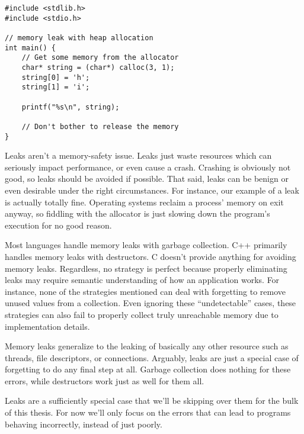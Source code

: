 \begin{verbatim}
#include <stdlib.h>
#include <stdio.h>

// memory leak with heap allocation
int main() {
    // Get some memory from the allocator
    char* string = (char*) calloc(3, 1);
    string[0] = 'h';
    string[1] = 'i';

    printf("%s\n", string);

    // Don't bother to release the memory
}
\end{verbatim}

Leaks aren't a memory-safety issue. Leaks just waste resources which can
seriously impact performance, or even cause a crash. Crashing is obviously not
good, so leaks should be avoided if possible. That said, leaks can be benign or
even desirable under the right circumstances. For instance, our example of a
leak is actually totally fine. Operating systems reclaim a process' memory on
exit anyway, so fiddling with the allocator is just slowing down the program's
execution for no good reason.

Most languages handle memory leaks with garbage collection. C++ primarily
handles memory leaks with destructors. C doesn't provide anything for avoiding
memory leaks. Regardless, no strategy is perfect because properly eliminating
leaks may require semantic understanding of how an application works. For
instance, none of the strategies mentioned can deal with forgetting to remove
unused values from a collection. Even ignoring these ``undetectable'' cases,
these strategies can also fail to properly collect truly unreachable memory
due to implementation details.

Memory leaks generalize to the leaking of basically any other resource such
as threads, file descriptors, or connections. Arguably, leaks are just a special
case of forgetting to do any final step at all. Garbage collection does nothing
for these errors, while destructors work just as well for them all.

Leaks are a sufficiently special case that we'll be skipping over them for
the bulk of this thesis. For now we'll only focus on the errors that can lead
to programs behaving incorrectly, instead of just poorly.


